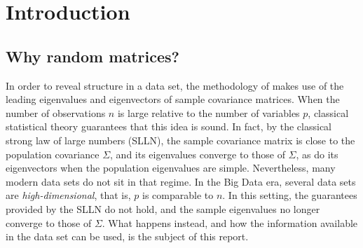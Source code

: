 
\section{Introduction}\label{sec:introduction}

\subsection*{Why random matrices?}

In order to reveal structure in a data set, the methodology of  makes use of the leading eigenvalues and eigenvectors of sample covariance matrices. When the number of observations \(n\) is large relative to the number of variables \(p\), classical statistical theory guarantees that this idea is sound. In fact, by the classical strong law of large numbers (SLLN), the sample covariance matrix is close to the population covariance \(\Sigma\), and its eigenvalues converge to those of \(\Sigma\), as do its eigenvectors when the population eigenvalues are simple. Nevertheless, many modern data sets do not sit in that regime. In the Big Data era, several data sets are \textit{high-dimensional}, that is, \(p\) is comparable to \(n\). In this setting, the guarantees provided by the SLLN do not hold, and the sample eigenvalues no longer converge to those of \(\Sigma\). What happens instead, and how the information available in the data set can be used, is the subject of this report.

